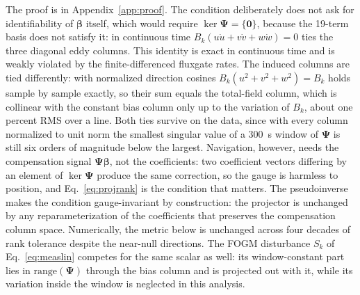 \documentclass{IEEEtaes}
\begin{document}
The proof is in Appendix~\ref{app:proof}. The condition deliberately does not
ask for identifiability of $\boldsymbol{\beta}$ itself, which would require
$\ker\boldsymbol{\Psi}=\{\mathbf{0}\}$, because the \num{19}-term basis does
not satisfy it: in continuous time
$B_k(u\dot{u}+v\dot{v}+w\dot{w})=0$ ties the three diagonal eddy columns.
This identity is exact in continuous time and is weakly violated by the
finite-differenced fluxgate rates. The induced columns are tied differently:
with normalized direction cosines $B_k(u^2+v^2+w^2)=B_k$ holds sample by
sample exactly, so their sum equals the total-field column, which is
collinear with the constant bias column only up to the variation of $B_k$,
about one percent RMS over a line. Both ties survive on the data, since with
every
column normalized to unit norm the smallest singular value of a
\SI{300}{\second} window of $\boldsymbol{\Psi}$ is still six orders of
magnitude below the largest. Navigation, however, needs the compensation
signal $\boldsymbol{\Psi}\boldsymbol{\beta}$, not the coefficients: two
coefficient vectors differing by an element of $\ker\boldsymbol{\Psi}$
produce the same correction, so the gauge is harmless to position, and
Eq.~\eqref{eq:projrank} is the condition that matters. The pseudoinverse
makes the condition gauge-invariant by construction: the projector is
unchanged by any reparameterization of the coefficients that preserves the
compensation column space. Numerically, the metric below is unchanged across
four decades of rank tolerance despite the near-null directions. The FOGM disturbance $S_k$ of
Eq.~\eqref{eq:measlin} competes for the same scalar as well: its
window-constant part lies in $\mathrm{range}(\boldsymbol{\Psi})$ through the
bias column and is projected out with it, while its variation inside the
window is neglected in this analysis.
\end{document}
